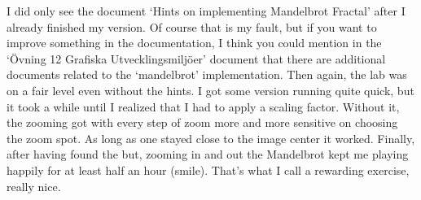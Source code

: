 \documentclass[a4paper,11pt,twoside]{article}
\begin{document}
I did only see the document `Hints on implementing Mandelbrot Fractal' after I
already finished my version. Of course that is my fault, but if you want to improve
something in the documentation, I think you could mention in the `Övning 12
Grafiska Utvecklingsmiljöer' document that there are additional documents related
to the `mandelbrot' implementation. Then again, the lab was on a fair level
even without the hints. I got some version running quite quick, but it took a
while until I realized that I had to apply a scaling factor. Without it, the
zooming got with every step of zoom more and more sensitive on choosing the
zoom spot. As long as one stayed close to the image center it worked. Finally,
after having found the but, zooming in and out the Mandelbrot kept me playing
happily for at least half an hour (smile). That's what I call a rewarding
exercise, really nice.


%
\end{document}
